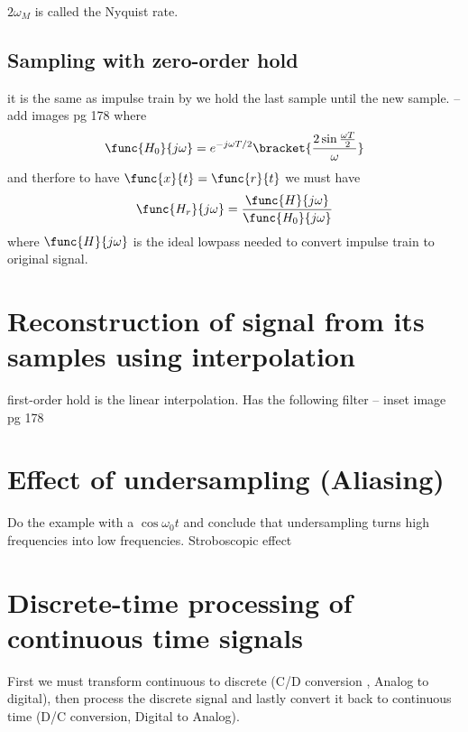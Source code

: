 \begin{definition}
    \(2\omega_M\) is called the Nyquist rate.
\end{definition}

\subsection*{Sampling with zero-order hold}
it is the same as impulse train by we hold the last sample until the new sample. -- add images pg 178
where 
\begin{equation*}
    \func{H_0}{j\omega} = e^{-j\omega T/2} \bracket{\dfrac{2 \sin \frac{\omega T}{2}}{\omega}}
\end{equation*}
and therfore to have \(\func{x}{t} = \func{r}{t}\) we must have 
\begin{equation*}
    \func{H_r}{j\omega} = \dfrac{\func{H}{j\omega}}{\func{H_0}{j\omega}}
\end{equation*}
where \(\func{H}{j\omega}\) is the ideal lowpass needed to convert impulse train to original signal.

\section{Reconstruction of signal from its samples using interpolation}
first-order hold is the linear interpolation. Has the following filter -- inset image pg 178

\section{Effect of undersampling (Aliasing)}
Do the example with a \(\cos \omega_0t\) and conclude that undersampling turns high frequencies into low frequencies. Stroboscopic effect 

\section{Discrete-time processing of continuous time signals}
First we must transform continuous to discrete (C/D conversion , Analog to digital), then process the discrete signal and lastly convert it back to continuous time (D/C conversion, Digital to Analog).
